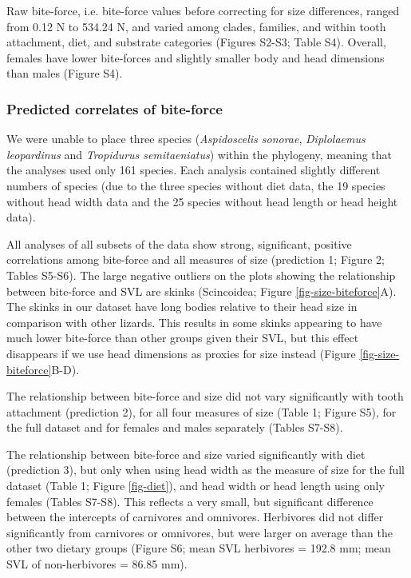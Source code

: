 \documentclass[a4paper, 12pt]{article}
\begin{document}
Raw bite-force, i.e. bite-force values before correcting for size differences, ranged from 0.12 N to 534.24 N, and varied among clades, families, and within tooth attachment, diet, and substrate categories (Figures S2-S3; Table S4). 
Overall, females have lower bite-forces and slightly smaller body and head dimensions than males (Figure S4).

\subsubsection{Predicted correlates of bite-force}
We were unable to place three species (\textit{Aspidoscelis sonorae}, \textit{Diplolaemus leopardinus} and \textit{Tropidurus semitaeniatus}) within the phylogeny, meaning that the analyses used only 161 species. 
Each analysis contained slightly different numbers of species (due to the three species without diet data, the 19 species without head width data and the 25 species without head length or head height data).

All analyses of all subsets of the data show strong, significant, positive correlations among bite-force and all measures of size (prediction 1; Figure 2; Tables S5-S6). 
The large negative outliers on the plots showing the relationship between bite-force and SVL are skinks (Scincoidea; Figure \ref{fig-size-biteforce}A). 
The skinks in our dataset have long bodies relative to their head size in comparison with other lizards. 
This results in some skinks appearing to have much lower bite-force than other groups given their SVL, but this effect disappears if we use head dimensions as proxies for size instead (Figure \ref{fig-size-biteforce}B-D).

The relationship between bite-force and size did not vary significantly with tooth attachment (prediction 2), for all four measures of size (Table 1; Figure S5), for the full dataset and for females and males separately (Tables S7-S8). 

The relationship between bite-force and size varied significantly with diet (prediction 3), but only when using head width as the measure of size for the full dataset (Table 1; Figure \ref{fig-diet}), and head width or head length using only females (Tables S7-S8). 
This reflects a very small, but significant difference between the intercepts of carnivores and omnivores. 
Herbivores did not differ significantly from carnivores or omnivores, but were larger on average than the other two dietary groups (Figure S6; mean SVL herbivores = 192.8 mm; mean SVL of non-herbivores = 86.85 mm).
\end{document}
